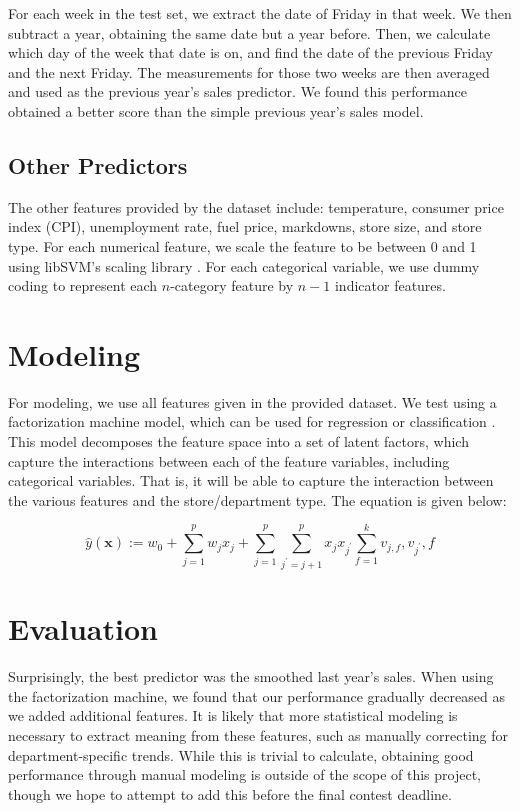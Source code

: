 \documentclass{article}
\begin{document}
For each week in the test set, we extract the date of Friday in that week. We then subtract a year, obtaining the same date but a year before. Then, we calculate which day of the week that date is on, and find the date of the previous Friday and the next Friday. The measurements for those two weeks are then averaged and used as the previous year's sales predictor. We found this performance obtained a better score than the simple previous year's sales model.

\subsection{Other Predictors}

The other features provided by the dataset include: temperature, consumer price index (CPI), unemployment rate, fuel price, markdowns, store size, and store type. For each numerical feature, we scale the feature to be between 0 and 1 using libSVM's scaling library \cite{chang2011libsvm}. For each categorical variable, we use dummy coding to represent each $n$-category feature by $n-1$ indicator features.

\section{Modeling}

For modeling, we use all features given in the provided dataset. We test using a factorization machine model, which can be used for regression or classification \cite{rendle2010factorization}. This model decomposes the feature space into a set of latent factors, which capture the interactions between each of the feature variables, including categorical variables. That is, it will be able to capture the interaction between the various features and the store/department type. The equation is given below:

\begin{equation}
\label{eq:fm}
\hat{y}(\mathbf{x}):= w_0 + \sum_{j=1}^{p} w_j x_j + \sum_{j=1}^{p} \sum_{j^{\prime}=j+1}^{p} x_j x_{j^{\prime}} \sum_{f=1}^{k} v_{j,f}, v_{j^{\prime}},f
\end{equation}


\section{Evaluation}
Surprisingly, the best predictor was the smoothed last year's sales. When using the factorization machine, we found that our performance gradually decreased as we added additional features. It is likely that more statistical modeling is necessary to extract meaning from these features, such as manually correcting for department-specific trends. While this is trivial to calculate, obtaining good performance through manual modeling is outside of the scope of this project, though we hope to attempt to add this before the final contest deadline.



\end{document}
